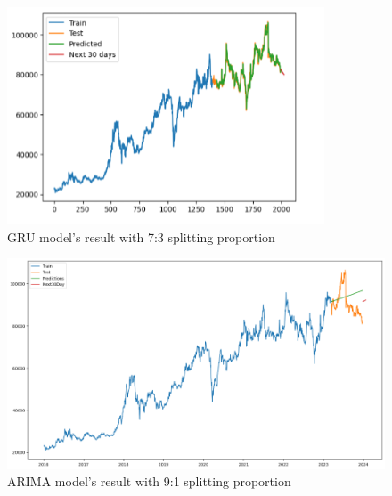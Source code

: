 \documentclass{ieeeojies}
\begin{document}
\begin{figure}[H]
  \centering
  \begin{minipage}{0.8\linewidth}
    \centering
    \includegraphics[width=\linewidth]{bibliography/GRU_VCB73.png}
    \caption{GRU model's result with 7:3 splitting proportion}
    \label{fig10}
  \end{minipage}
\end{figure}
\begin{figure}[H]
  \centering
  \begin{minipage}{0.8\linewidth}
    \centering
    \includegraphics[width=\linewidth]{bibliography/ARIMA_VCB91.png}
    \caption{ARIMA model's result with 9:1 splitting proportion}
    \label{fig11}
  \end{minipage}
\end{figure}
\end{document}

